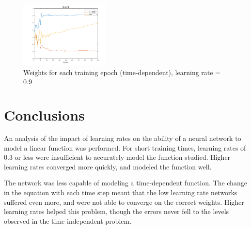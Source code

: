 \documentclass{IEEEtran}
\begin{document}
\begin{centering}
\begin{figure}
\begin{center}
	\includegraphics[width=0.4\textwidth]{weights_time_09lr}
	\caption{Weights for each training epoch (time-dependent), learning rate = 0.9\label{fig:wgt09time}}
\end{center}
\end{figure}
\end{centering}

\section{Conclusions}
An analysis of the impact of learning rates on the ability of a neural network to model a linear function was performed. For short training times, learning rates of 0.3 or less were insufficient to accurately model the function studied. Higher learning rates converged more quickly, and modeled the function well.

The network was less capable of modeling a time-dependent function. The change in the equation with each time step meant that the low learning rate networks suffered even more, and were not able to converge on the correct weights. Higher learning rates helped this problem, though the errors never fell to the levels observed in the time-independent problem.
\end{document}
